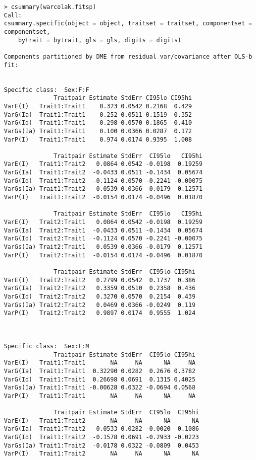 \documentclass[titlepage]{article}  %
\begin{document}
\begin{verbatim}
> csummary(warcolak.fitsp)
Call:
csummary.specific(object = object, traitset = traitset, componentset = componentset, 
    bytrait = bytrait, gls = gls, digits = digits)

Components partitioned by DME from residual var/covariance after OLS-b fit:


Specific class:  Sex:F:F 
              Traitpair Estimate StdErr CI95lo CI95hi
VarE(I)   Trait1:Trait1    0.323 0.0542 0.2168  0.429
VarG(Ia)  Trait1:Trait1    0.252 0.0511 0.1519  0.352
VarG(Id)  Trait1:Trait1    0.298 0.0570 0.1865  0.410
VarGs(Ia) Trait1:Trait1    0.100 0.0366 0.0287  0.172
VarP(I)   Trait1:Trait1    0.974 0.0174 0.9395  1.008

              Traitpair Estimate StdErr  CI95lo   CI95hi
VarE(I)   Trait1:Trait2   0.0864 0.0542 -0.0198  0.19259
VarG(Ia)  Trait1:Trait2  -0.0433 0.0511 -0.1434  0.05674
VarG(Id)  Trait1:Trait2  -0.1124 0.0570 -0.2241 -0.00075
VarGs(Ia) Trait1:Trait2   0.0539 0.0366 -0.0179  0.12571
VarP(I)   Trait1:Trait2  -0.0154 0.0174 -0.0496  0.01870

              Traitpair Estimate StdErr  CI95lo   CI95hi
VarE(I)   Trait2:Trait1   0.0864 0.0542 -0.0198  0.19259
VarG(Ia)  Trait2:Trait1  -0.0433 0.0511 -0.1434  0.05674
VarG(Id)  Trait2:Trait1  -0.1124 0.0570 -0.2241 -0.00075
VarGs(Ia) Trait2:Trait1   0.0539 0.0366 -0.0179  0.12571
VarP(I)   Trait2:Trait1  -0.0154 0.0174 -0.0496  0.01870

              Traitpair Estimate StdErr  CI95lo CI95hi
VarE(I)   Trait2:Trait2   0.2799 0.0542  0.1737  0.386
VarG(Ia)  Trait2:Trait2   0.3359 0.0510  0.2358  0.436
VarG(Id)  Trait2:Trait2   0.3270 0.0570  0.2154  0.439
VarGs(Ia) Trait2:Trait2   0.0469 0.0366 -0.0249  0.119
VarP(I)   Trait2:Trait2   0.9897 0.0174  0.9555  1.024



Specific class:  Sex:F:M 
              Traitpair Estimate StdErr  CI95lo CI95hi
VarE(I)   Trait1:Trait1       NA     NA      NA     NA
VarG(Ia)  Trait1:Trait1  0.32290 0.0282  0.2676 0.3782
VarG(Id)  Trait1:Trait1  0.26698 0.0691  0.1315 0.4025
VarGs(Ia) Trait1:Trait1 -0.00628 0.0322 -0.0694 0.0568
VarP(I)   Trait1:Trait1       NA     NA      NA     NA

              Traitpair Estimate StdErr  CI95lo  CI95hi
VarE(I)   Trait1:Trait2       NA     NA      NA      NA
VarG(Ia)  Trait1:Trait2   0.0533 0.0282 -0.0020  0.1086
VarG(Id)  Trait1:Trait2  -0.1578 0.0691 -0.2933 -0.0223
VarGs(Ia) Trait1:Trait2  -0.0178 0.0322 -0.0809  0.0453
VarP(I)   Trait1:Trait2       NA     NA      NA      NA


\end{verbatim}
\end{document}
